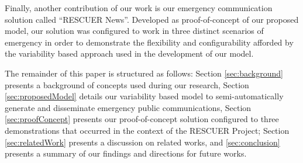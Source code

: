 Finally, another contribution of our work is our emergency communication solution called ``RESCUER News''. Developed as proof-of-concept of our proposed model, our solution was configured to work in three distinct scenarios of emergency in order to demonstrate the flexibility and configurability afforded by the variability based approach used in the development of our model. 


The remainder of this paper is structured as follows: Section \ref{sec:background} presents a background of concepts used during our research, Section \ref{sec:proposedModel} details our variability based model to semi-automatically generate and disseminate emergency public communications, Section \ref{sec:proofConcept} presents our proof-of-concept solution configured to three demonstrations that occurred in the context of the RESCUER Project; Section \ref{sec:relatedWork} presents a discussion on related works, and \ref{sec:conclusion} presents a summary of our findings and directions for future works.

